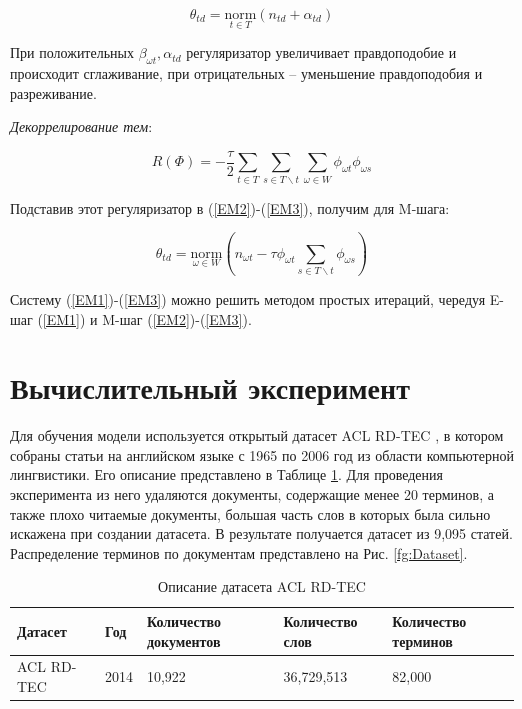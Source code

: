 \documentclass[a4paper, 12pt]{article}
\begin{document}
    \begin{equation}
        \theta_{td} = \underset{t \in T}{\text{norm}}(n_{td} + \alpha_{td})
    \end{equation}

    При положительных $\beta_{\omega t}, \alpha_{td}$ регуляризатор увеличивает правдоподобие и происходит сглаживание, при отрицательных -- уменьшение правдоподобия и разреживание.

    \textit{Декоррелирование тем}:

    \begin{equation}
        R(\Phi) = -\frac{\tau}{2}\sum\limits_{t \in T}\sum\limits_{s \in T\backslash t}\sum\limits_{\omega \in W}\phi_{\omega t}\phi_{\omega s}
    \end{equation}

    Подставив этот регуляризатор в (\ref{EM2})-(\ref{EM3}), получим для M-шага:

    \begin{equation}
        \theta_{td} = \underset{\omega \in W}{\text{norm}}(n_{\omega t} - \tau \phi_{\omega t} \sum\limits_{s \in T\backslash t}\phi_{\omega s})
    \end{equation}

    Систему (\ref{EM1})-(\ref{EM3}) можно решить методом простых итераций, чередуя E-шаг (\ref{EM1}) и M-шаг (\ref{EM2})-(\ref{EM3}).

\section{Вычислительный эксперимент}

    Для обучения модели используется открытый датасет ACL RD-TEC \citep{QZadeh2014}, в котором собраны статьи на английском языке с 1965 по 2006 год из области компьютерной лингвистики. Его описание представлено в Таблице \ref{table:Dataset}. Для проведения эксперимента из него удаляются документы, содержащие менее 20 терминов, а также плохо читаемые документы, большая часть слов в которых была сильно искажена при создании датасета. В результате получается датасет из 9,095 статей. Распределение терминов по документам представлено на Рис. \ref{fg:Dataset}.

 \begin{table}[t]%
    \caption{Описание датасета ACL RD-TEC}
    \label{table:Dataset}
    \centering\medskip%
    \begin{tabular}{| p{75 pt} | p{50 pt} | p{70 pt} | p{70 pt} | p{70 pt} |}
    \hline
        Датасет
            & Год
            & Количество документов
            & Количество слов
            & Количество терминов \\ \hline
        ACL RD-TEC
            & 2014
            & 10,922
            & 36,729,513
            & 82,000 \\
    \hline
    \end{tabular}
\end{table}
\end{document}
